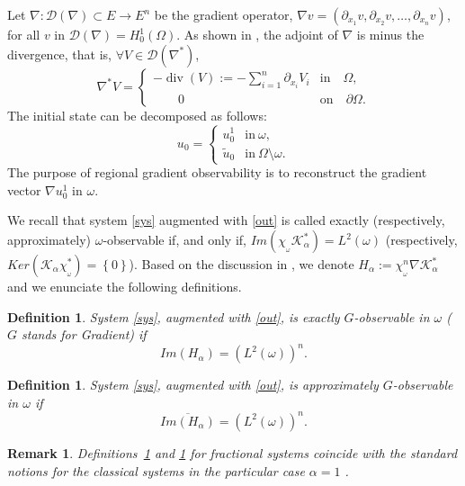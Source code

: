 \documentclass{article}
\newtheorem{definition}[theorem]{Definition}
\newtheorem{remark}[theorem]{Remark}
\begin{document}
Let $\nabla : \mathcal{D}(\nabla)\subset E \rightarrow E^n$ 
be the gradient operator, $\nabla v = \left(\partial_{x_1} v,
\partial_{x_2} v,\ldots,\partial_{x_n} v\right)$, 
for all $ v$ in $ \mathcal{D}(\nabla) = H_0^1(\Omega)$. 
As shown in \cite{Kurula.2012}, the adjoint of $\nabla$ 
is minus the divergence, that is, $\forall V\in\mathcal{D}(\nabla^*)$,
$$
\nabla^*V 
= \left\{
\begin{array}{ll}
-\operatorname{div}(V) 
:= -\displaystyle\sum_{i=1}^{n}\partial_{x_i} V_i 
& \text{in} \quad \Omega,\\
\qquad 0& \text{on} \quad \partial\Omega.
\end{array}\right.
$$
The initial state can be decomposed as follows: 
$$
u_0=\left\{
\begin{array}{ll}
u_0^1& \text{in} \ \omega,\\
\tilde{u}_0 & \text{in} \ \Omega\setminus\omega.
\end{array}\right.
$$
The purpose of regional gradient observability is to reconstruct 
the gradient vector $\nabla u_0^1$ in $\omega$.

We recall that system \eqref{sys} augmented with \eqref{out} 
is called exactly (respectively, approximately) $\omega$-observable 
if, and only if, $Im\left(\chi_{_\omega}\mathcal{K}_\alpha^*\right) 
= L^2(\omega)$ (respectively, $Ker\left(\mathcal{K}_\alpha\chi_{_\omega}^*\right) 
= \left\{0\right\}$). Based on the discussion 
in \cite{zerrik.grd.2003}, we denote 
$H_\alpha := \chi_{_\omega}^n\nabla\mathcal{K}_\alpha^*$ 
and we enunciate the following definitions.

\begin{definition}
\label{def:d1}
System \eqref{sys}, augmented with \eqref{out}, 
is exactly $G$-observable in $\omega$ 
($G$ stands for Gradient) if 
\begin{equation}
\label{exact.G}
Im\left(H_\alpha\right) = \left(L^2(\omega)\right)^n.
\end{equation}
\end{definition}

\begin{definition}
\label{def:d2}
System \eqref{sys}, augmented with \eqref{out}, 
is approximately $G$-observable in $\omega$ if 
\begin{equation}
\label{app.G}
\overline{Im\left(H_\alpha\right)} 
= \left(L^2(\omega)\right)^n.
\end{equation}
\end{definition}

\begin{remark} 
Definitions~\ref{def:d1} and \ref{def:d2} for fractional systems 
coincide with the standard notions for the classical systems 
in the particular case $\alpha=1$ \cite{zerrik.grd.2003}.
\end{remark}
\end{document}
